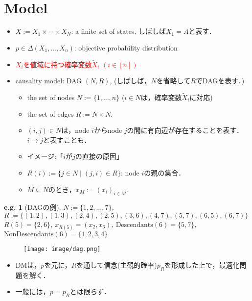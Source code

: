 \documentclass[11pt,a4paper,dvipdfmx]{article}
\theoremstyle{plain}
\newtheorem{eg}{e.g.}[section]
\renewcommand{\tilde}{\widetilde}
\newcommand{\ocomment}[1]{{\textcolor{red}{#1}}}
\begin{document}
\section{Model}
\begin{itemize}	
	\item $X := X_1 \times \cdots \times X_N$: a finite set of states. しばしば$X_1 = A$と表す．
	\item $p \in \Delta(X_1, \dots, X_n)$: objective probability distribution
	\item \ocomment{$X_i$を値域に持つ確率変数$\tilde{X}_i$ $(i \in [n])$}
	\item causality model: DAG $(N, R)$, (しばしば，$N$を省略して$R$でDAGを表す．)
		\begin{itemize}
			\item the set of nodes $N := \{1, \dots, n\}$ ($i \in N$は，確率変数$\tilde{X}_i$に対応)
			\item the set of edges $R := N \times N$.
			\item $(i, j) \in N$は，node $i$からnode $j$の間に有向辺が存在することを表す．$i \rightarrow j$と表すことも．
			\item イメージ:「$i$が$j$の直接の原因」
			\item $R(i) := \{j \in N \mid (j, i) \in R \}$: node $i$の親の集合．
			\item $M \subseteq N$のとき，$x_M := (x_i)_{i \in M}$.
		\end{itemize}
\end{itemize}

\begin{screen}
\begin{eg}[DAGの例]
	$N := \{1,2,\dots,7\}$, \\
	$R:=\{(1,2), (1,3), (2,4), (2,5), (3,6), (4,7), (5,7), (6,5), (6,7)\}$ \\ 
	$R(5) = \{2,6\}$, $x_{R(5)} = (x_2, x_6)$, $\text{Descendants}(6) = \{5, 7\}$, $\text{NonDescendants}(6) = \{1,2,3,4\}$
\end{eg}
\begin{figure}[H]
  \centering
    \texttt{[image: image/dag.png]}
\end{figure}
\end{screen}

\begin{itemize}
	\item DMは，$p$を元に，$R$を通して信念(主観的確率)$p_R$を形成した上で，最適化問題を解く．
	\item 一般には，$p = p_R$とは限らず．
\end{itemize}
\end{document}
